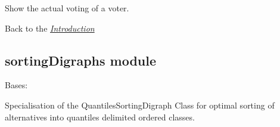 \documentclass[letterpaper,10pt,english]{sphinxmanual}
\begin{document}
\begin{fulllineitems}
\begin{fulllineitems}
\end{fulllineitems}


\begin{fulllineitems}
\label{techDoc:votingDigraphs.VotingProfile.showVoterBallot}
Show the actual voting of a voter.

\end{fulllineitems}


\end{fulllineitems}


Back to the {\hyperref[techDoc:introduction-label]{\emph{Introduction}}}


\subsection{sortingDigraphs module}
\label{techDoc:sortingdigraphs-label}\label{techDoc:module-sortingDigraphs}\label{techDoc:sortingdigraphs-module}

\begin{fulllineitems}
\label{techDoc:sortingDigraphs.OptimalQuantilesSortingDigraph}
Bases: {\hyperref[techDoc:sortingDigraphs.QuantilesSortingDigraph]{}}

Specialisation of the QuantilesSortingDigraph Class
for optimal sorting of alternatives into
quantiles delimited ordered classes.

\end{fulllineitems}

\end{document}
